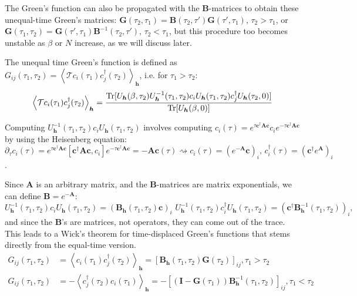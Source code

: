 The Green's function can also be propagated with the $\bm B$-matrices to obtain these unequal-time Green's matrices: $\bm G ( \tau_2, \tau_1) = \bm B ( \tau_2, \tau') \bm G ( \tau', \tau_1)$, $\tau_2 > \tau_1$, or $\bm G ( \tau_1, \tau_2) =  \bm G ( \tau', \tau_1) \bm B^{-1} ( \tau_2, \tau') , \, \tau_2 < \tau_1$, but this procedure too becomes unstable as $\beta$ or $N$ increase, as we will discuss later.

The unequal time Green's function is defined as 
$
G_{ij} ( \tau_1, \tau_2 ) = \left\langle \mathcal{T} c_i ( \tau_1 ) c_j^\dagger ( \tau_2 ) \right\rangle_{\bm h}
$, 
i.e. for $\tau_1 > \tau_2$:
\begin{equation}
\left\langle \mathcal{T} c_i ( \tau_1 ) c_j^\dagger ( \tau_2 ) \right\rangle_{\bm h} = \frac{\operatorname{Tr} [ U_{\bm h} (\beta, \tau_2 ) U_{\bm h}^{-1} (\tau_1, \tau_2) c_i U_{\bm h} (\tau_1, \tau_2 ) c_j^\dagger U_{\bm h} (\tau_2, 0) ]}{\operatorname{Tr}[ U_{\bm h}(\beta, 0) ]}
\end{equation}

Computing $U_{\bm h}^{-1} (\tau_1, \tau_2) c_i U_{\bm h} (\tau_1, \tau_2 )$ involves computing $c_i ( \tau ) = e^{\tau \bm c^\dagger \bm A \bm c} c_i e^{-\tau \bm c^\dagger \bm A \bm c}$ by using the Heisenberg equation:
$
\partial_\tau c_i ( \tau ) = e^{\tau \bm c^\dagger \bm A \bm c} [ \bm c^\dagger \bm A \bm c, c_i ] e^{-\tau \bm c^\dagger \bm A \bm c} = - \bm A \bm c ( \tau ) \rightsquigarrow c_i (\tau ) = ( e^{-\bm A} \bm c )_i , \, c_i ^\dagger(\tau ) = ( \bm c^\dagger e^{\bm A}  )_i 
$.

Since $\bm A$ is an arbitrary matrix, and the $\bm B$-matrices are matrix exponentials, we can define $\bm B = e^{-\bm A}$:
\begin{equation}
U_{\bm h}^{-1} (\tau_1, \tau_2) c_i U_{\bm h} (\tau_1, \tau_2 ) = ( \bm B_{\bm h} ( \tau_1 , \tau_2 ) \bm c )_i \,\,
U_{\bm h}^{-1} (\tau_1, \tau_2) c_i^\dagger U_{\bm h} (\tau_1, \tau_2 ) = ( \bm c^\dagger \bm B_{\bm h}^{-1} ( \tau_1 , \tau_2 )  )_i ,
\end{equation}
and since the $\bm B$'s are matrices, not operators, they can come out of the trace.
This leads to a Wick's theorem for time-displaced Green's functions that stems directly from the equal-time version.
\begin{equation}
\begin{split}
G_{ij} ( \tau_1 , \tau_2 ) &= \left\langle  c_i ( \tau_1 ) c_j^\dagger ( \tau_2 ) \right\rangle_{\bm h} = [ \bm B_{\bm h} (\tau_1, \tau_2 ) \bm G ( \tau_2 ) ]_{ij} , \tau_1 > \tau_2 \\
G_{ij} ( \tau_1 , \tau_2 ) &= -\left\langle  c_j^\dagger ( \tau_2 ) c_i ( \tau_1 )  \right\rangle_{\bm h} = - [ ( \bm I - \bm G ( \tau_1 ) ) \bm B_{\bm h}^{-1} (\tau_1, \tau_2 ) ]_{ij} , \tau_1 < \tau_2
\end{split}
\end{equation}
